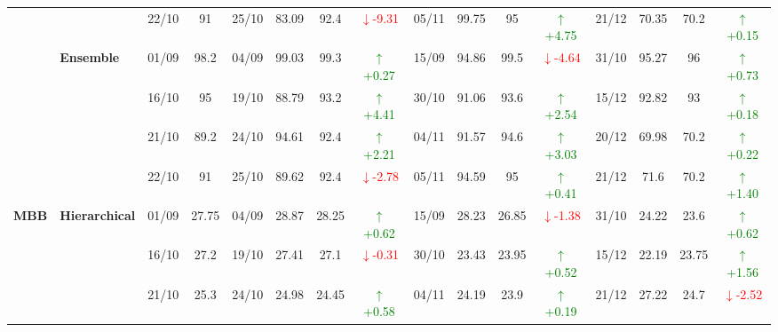 {\begin{longtable}{llcc|cccc|cccc|cccc}
&
& 22/10 & 91 & 25/10 & 83.09 & 92.4 & \textcolor{red}{\(\downarrow\)-9.31} & 05/11 & 99.75 & 95 & \textcolor{green}{\(\uparrow\)+4.75} & 21/12 & 70.35 & 70.2 & \textcolor{green}{\(\uparrow\)+0.15} \\
\cmidrule(lr){2-16}


& \textbf{Ensemble}
& 01/09 & 98.2 & 04/09 & 99.03 & 99.3 & \textcolor{green}{\(\uparrow\)+0.27} & 15/09 & 94.86 & 99.5 & \textcolor{red}{\(\downarrow\)-4.64} & 31/10 & 95.27 & 96 & \textcolor{green}{\(\uparrow\)+0.73} \\

&
& 16/10 & 95 & 19/10 & 88.79 & 93.2 & \textcolor{green}{\(\uparrow\)+4.41} & 30/10 & 91.06 & 93.6 & \textcolor{green}{\(\uparrow\)+2.54} & 15/12 & 92.82 & 93 & \textcolor{green}{\(\uparrow\)+0.18} \\

&
& 21/10 & 89.2 & 24/10 & 94.61 & 92.4 & \textcolor{green}{\(\uparrow\)+2.21} & 04/11 & 91.57 & 94.6 & \textcolor{green}{\(\uparrow\)+3.03} & 20/12 & 69.98 & 70.2 & \textcolor{green}{\(\uparrow\)+0.22} \\

&
& 22/10 & 91 & 25/10 & 89.62 & 92.4 & \textcolor{red}{\(\downarrow\)-2.78} & 05/11 & 94.59 & 95 & \textcolor{green}{\(\uparrow\)+0.41} & 21/12 & 71.6 & 70.2 & \textcolor{green}{\(\uparrow\)+1.40} \\
\midrule



\multirow{12}{*}{\textbf{MBB}} 
& \textbf{Hierarchical}
& 01/09 & 27.75 & 04/09 & 28.87 & 28.25 & \textcolor{green}{\(\uparrow\)+0.62} & 15/09 & 28.23 & 26.85 & \textcolor{red}{\(\downarrow\)-1.38} & 31/10 & 24.22 & 23.6 & \textcolor{green}{\(\uparrow\)+0.62} \\

&
& 16/10 & 27.2 & 19/10 & 27.41 & 27.1 & \textcolor{red}{\(\downarrow\)-0.31} & 30/10 & 23.43 & 23.95 & \textcolor{green}{\(\uparrow\)+0.52} & 15/12 & 22.19 & 23.75 & \textcolor{green}{\(\uparrow\)+1.56} \\

&
& 21/10 & 25.3 & 24/10 & 24.98 & 24.45 & \textcolor{green}{\(\uparrow\)+0.58} & 04/11 & 24.19 & 23.9 & \textcolor{green}{\(\uparrow\)+0.19} & 21/12 & 27.22 & 24.7 & \textcolor{red}{\(\downarrow\)-2.52} \\


\end{longtable}}
